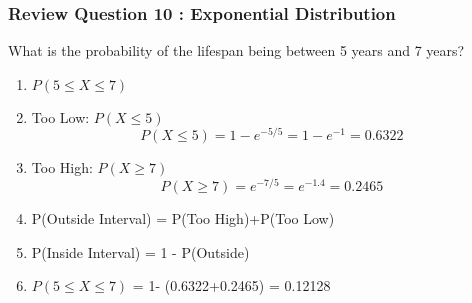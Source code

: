 \begin{frame}
\frametitle{Review Question 10 :  Exponential Distribution}
What is the probability of the lifespan being between 5 years and 7 years?
    \begin{enumerate}
    \item $P(5 \leq X \leq 7)$
    \item Too Low: $P(X \leq 5)$
    \[P(X \leq 5) = 1- e^{-5/5} = 1-e^{-1} = 0.6322 \]
    \item Too High: $P(X \geq 7)$
    \[P(X \geq 7) = e^{-7/5} = e^{-1.4} = 0.2465 \]
    \item P(Outside Interval) = P(Too High)+P(Too Low)
    \item P(Inside Interval) = 1 - P(Outside)
    \item $P(5 \leq X \leq 7)$ = 1- (0.6322+0.2465) = 0.12128
    \end{enumerate}
\end{frame}





